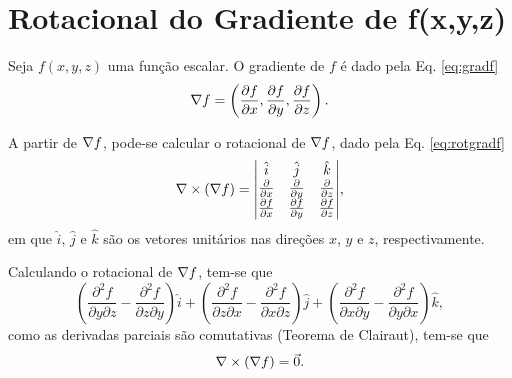 \section{Rotacional do Gradiente de f(x,y,z)} \label{sec:ex1}
Seja $f(x,y,z)$ uma fun\c{c}\~ao escalar. O gradiente de $f$ \'e dado pela Eq. \eqref{eq:gradf}
\begin{equation}
    \label{eq:gradf}
    \nabla f = \left( \frac{\partial f}{\partial x}, \frac{\partial f}{\partial y}, \frac{\partial f}{\partial z} \right).
\end{equation}

A partir de $\nabla f$, pode-se calcular o rotacional de $\nabla f$, dado pela Eq. \eqref{eq:rotgradf}
\begin{equation}
    \label{eq:rotgradf}
    \nabla \times (\nabla f) = 
    \begin{matrix}
        \begin{vmatrix}
            \hat{i} & \hat{j} & \hat{k} \\
            \frac{\partial}{\partial x} & \frac{\partial}{\partial y} & \frac{\partial}{\partial z} \\
            \frac{\partial f}{\partial x} & \frac{\partial f}{\partial y} & \frac{\partial f}{\partial z}
        \end{vmatrix}
    \end{matrix},        
\end{equation}
em que $\hat{i}$, $\hat{j}$ e $\hat{k}$ s\~ao os vetores unit\'arios nas dire\c{c}\~oes $x$, $y$ e $z$, respectivamente.

Calculando o rotacional de $\nabla f$, tem-se que
\begin{equation*}
    \left( \frac{\partial^2 f}{\partial y \partial z} - \frac{\partial^2 f}{\partial z \partial y} \right) \hat{i} + 
        \left( \frac{\partial^2 f}{\partial z \partial x} - \frac{\partial^2 f}{\partial x \partial z} \right) \hat{j} + 
        \left( \frac{\partial^2 f}{\partial x \partial y} - \frac{\partial^2 f}{\partial y \partial x} \right) \hat{k},
\end{equation*}
como as derivadas parciais s\~ao comutativas (Teorema de Clairaut), tem-se que
\begin{equation*}
    \nabla \times (\nabla f) = \vec{0}.
\end{equation*}




